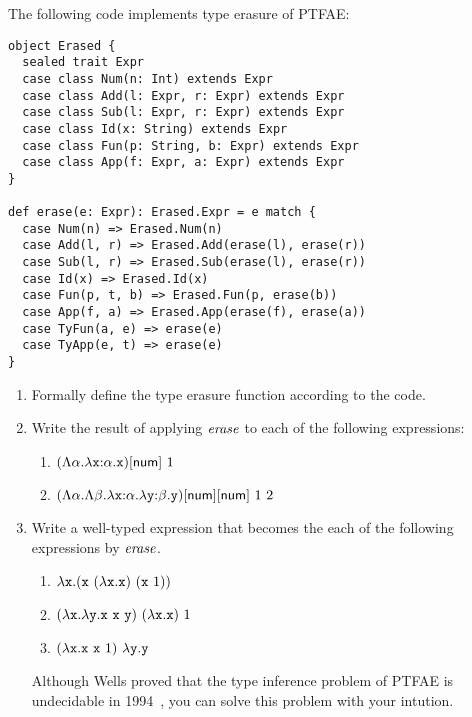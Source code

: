 \begin{exercise}

\item The following code implements type erasure of \textsf{PTFAE}:

\begin{verbatim}
object Erased {
  sealed trait Expr
  case class Num(n: Int) extends Expr
  case class Add(l: Expr, r: Expr) extends Expr
  case class Sub(l: Expr, r: Expr) extends Expr
  case class Id(x: String) extends Expr
  case class Fun(p: String, b: Expr) extends Expr
  case class App(f: Expr, a: Expr) extends Expr
}

def erase(e: Expr): Erased.Expr = e match {
  case Num(n) => Erased.Num(n)
  case Add(l, r) => Erased.Add(erase(l), erase(r))
  case Sub(l, r) => Erased.Sub(erase(l), erase(r))
  case Id(x) => Erased.Id(x)
  case Fun(p, t, b) => Erased.Fun(p, erase(b))
  case App(f, a) => Erased.App(erase(f), erase(a))
  case TyFun(a, e) => erase(e)
  case TyApp(e, t) => erase(e)
}
\end{verbatim}

\begin{enumerate}
  \item Formally define the type erasure function
     according to the code.
  \item Write the result of applying $\mbox{\emph{erase}}$ to each of the following
    expressions:
    \begin{enumerate}
      \item
        $(\Lambda\alpha.\lambda\texttt{x}{:}\alpha.\texttt{x})[\textsf{num}]\ 1$
      \item
        $(\Lambda\alpha.\Lambda\beta.\lambda\texttt{x}{:}\alpha.\lambda\texttt{y}{:}\beta.\texttt{y})[\textsf{num}][\textsf{num}]\ 1\ 2$
    \end{enumerate}
\item Write a well-typed expression that becomes the each of the following
  expressions by $\mbox{\emph{erase}}$.

    \begin{enumerate}
      \item
        $\efun{\cx}{\eapp{(\eapp{\cx}{(\efun{\cx}{\cx})}}{(\cx\ 1))}}$
      \item
        $(\lambda\texttt{x}.\lambda\texttt{y}.\texttt{x}\ \texttt{x}\ \texttt{y})\ (\lambda\texttt{x}.\texttt{x})\ 1$
      \item
        $(\lambda\texttt{x}.\texttt{x}\ \texttt{x}\ 1)\ \lambda\texttt{y}.\texttt{y}$
    \end{enumerate}

    Although Wells proved that the type inference problem of \textsf{PTFAE} is
    undecidable in 1994~\cite{wells1994typability}, you can solve this problem
    with your intution.

\end{enumerate}

\end{exercise}

